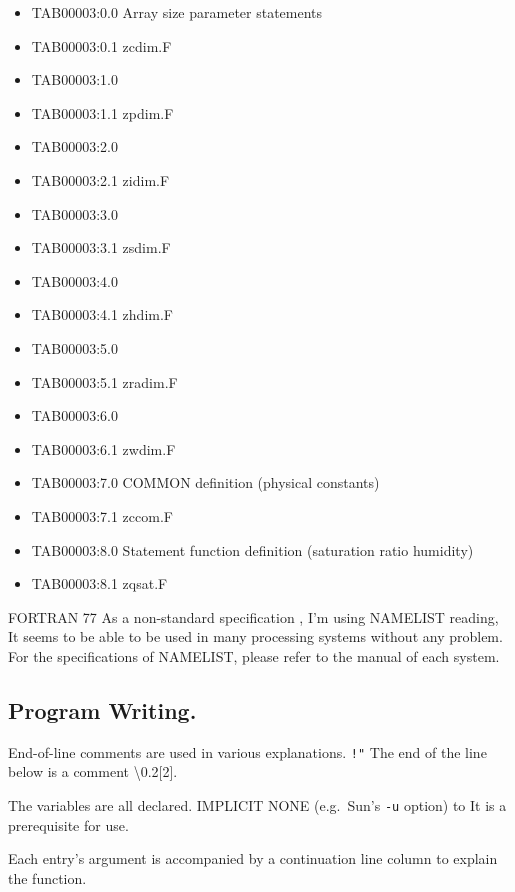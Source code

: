 \begin{itemize}
\item
  TAB00003:0.0 Array size parameter statements
\item
  TAB00003:0.1 zcdim.F
\item
  TAB00003:1.0
\item
  TAB00003:1.1 zpdim.F
\item
  TAB00003:2.0
\item
  TAB00003:2.1 zidim.F
\item
  TAB00003:3.0
\item
  TAB00003:3.1 zsdim.F
\item
  TAB00003:4.0
\item
  TAB00003:4.1 zhdim.F
\item
  TAB00003:5.0
\item
  TAB00003:5.1 zradim.F
\item
  TAB00003:6.0
\item
  TAB00003:6.1 zwdim.F
\item
  TAB00003:7.0 COMMON definition (physical constants)
\item
  TAB00003:7.1 zccom.F
\item
  TAB00003:8.0 Statement function definition (saturation ratio humidity)
\item
  TAB00003:8.1 zqsat.F
\end{itemize}

FORTRAN 77 As a non-standard specification , I'm using NAMELIST reading,
It seems to be able to be used in many processing systems without any
problem. For the specifications of NAMELIST, please refer to the manual
of each system.

\hypertarget{program-writing.}{%
\subsection{Program Writing.}\label{program-writing.}}

End-of-line comments are used in various explanations. \texttt{!"} The
end of the line below is a comment \textbackslash0.2{[}2{]}.

The variables are all declared. IMPLICIT NONE (e.g.~Sun's {\texttt{-u}}
option) to It is a prerequisite for use.

Each entry's argument is accompanied by a continuation line column to
explain the function.

